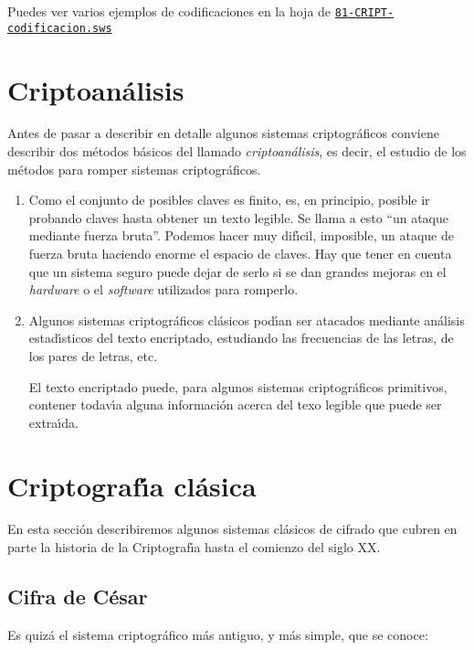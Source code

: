 Puedes ver varios ejemplos de codificaciones en la hoja de {\sage}
\href{http://sage.mat.uam.es:8888/home/pub/21/}{\tt 81-CRIPT-codificacion.sws}

\section{Criptoan\'alisis}

Antes de pasar a describir en detalle algunos sistemas criptogr\'aficos conviene
describir dos m\'etodos b\'asicos del llamado {\it criptoan\'alisis}, es decir,
el estudio de los m\'etodos para romper sistemas criptogr\'aficos.

\begin{enumerate}
 \item Como el conjunto de posibles claves es finito, es, en principio,  posible
ir probando claves hasta obtener un texto legible. Se llama a esto ``un ataque
mediante fuerza bruta''. Podemos hacer  muy dif\'{\i}cil, imposible, un ataque
de fuerza bruta haciendo enorme el espacio de claves. 
Hay que tener en cuenta
que un sistema seguro puede dejar de serlo si se dan grandes mejoras en el
{\itshape hardware} o el {\itshape software} utilizados para romperlo.
 
 \item Algunos sistemas criptogr\'aficos cl\'asicos pod\'{\i}an ser atacados
mediante
an\'alisis estad\'{\i}sticos del texto encriptado, estudiando las frecuencias de
las letras, de los pares de letras, etc.

El texto encriptado puede, para algunos sistemas criptogr\'aficos primitivos,
contener todav\'{\i}a alguna informaci\'on acerca del texo legible que puede
ser extra\'{\i}da.
\end{enumerate}

\section{Criptograf\'{\i}a cl\'asica}

En esta secci\'on describiremos algunos sistemas cl\'asicos de cifrado que
cubren en parte la historia de la Criptograf\'{\i}a hasta el comienzo del siglo
XX.


\subsection{Cifra de C\'esar}

Es quiz\'a el sistema criptogr\'afico m\'as antiguo, y m\'as simple,  que se
conoce:

